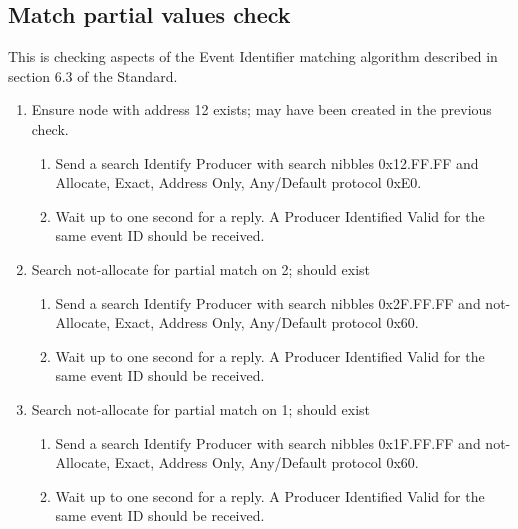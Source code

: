 \subsection{Match partial values check}

This is checking aspects of the Event Identifier matching algorithm described
in section 6.3 of the Standard.

\begin{enumerate}

\item Ensure node with address 12 exists; may have been created in the previous check.

    \begin{enumerate}
    \item Send a search Identify Producer with search nibbles 0x12.FF.FF and 
        Allocate, Exact, Address Only, Any/Default protocol 0xE0.

    \item Wait up to one second for a reply.  A Producer Identified Valid for the same event ID
        should be received.
    \end{enumerate}

\item Search not-allocate for partial match on 2; should exist
    \begin{enumerate}
    \item Send a search Identify Producer with search nibbles 0x2F.FF.FF and 
        not-Allocate, Exact, Address Only, Any/Default protocol 0x60.

    \item Wait up to one second for a reply.  A Producer Identified Valid for the same event ID
        should be received.
    \end{enumerate}

\item Search not-allocate for partial match on 1; should exist
    \begin{enumerate}
    \item Send a search Identify Producer with search nibbles 0x1F.FF.FF and 
        not-Allocate, Exact, Address Only, Any/Default protocol 0x60.

    \item Wait up to one second for a reply.  A Producer Identified Valid for the same event ID
        should be received.
    \end{enumerate}

\end{enumerate}

